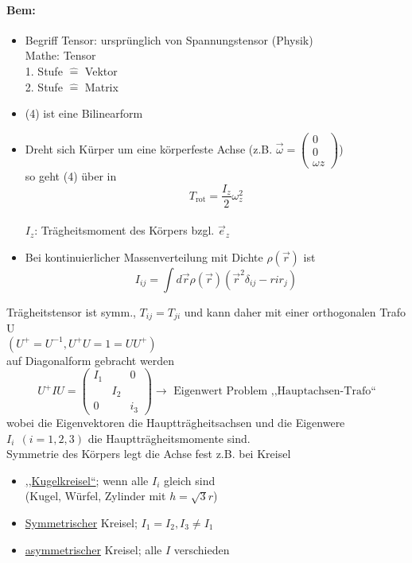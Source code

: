 \documentclass[titlepage,12pt,a4paper,ngerman]{report}
\newcommand{\tx}[1]{\textrm{#1}}
\begin{document}
{\paragraph{Bem:}
\begin{itemize}
	\item Begriff Tensor: ursprünglich von Spannungstensor (Physik) \\
	Mathe: Tensor \\
	1. Stufe $ \widehat{=} $ Vektor\\
	2. Stufe $ \widehat{=} $ Matrix
	\item (4) ist eine Bilinearform
	\item Dreht sich Kürper um eine körperfeste Achse (z.B. $ \vec{\omega} = \begin{pmatrix}
	0\\ 0\\ \omega z
	\end{pmatrix} $) \\
	so geht (4) über in
	$$ T_{\tx{rot}} = \frac{I_z}{2} \omega_z^2$$\\
	$ I_z $: Trägheitsmoment des Körpers bzgl. $ \vec{e}_z $
	\item Bei kontinuierlicher Massenverteilung mit Dichte $ \rho(\vec{r}) $ ist 
	$$I_{ij} = \int d \vec{r} \rho(\vec{r}) (\vec{r}^2 \delta_{ij} - rir_j)$$
\end{itemize}
Trägheitstensor ist symm., $ T_{ij} = T_{ji} $ und kann daher mit einer orthogonalen Trafo U\\
$( U^+ = U^{-1}, U^+ U = 1 = U U ^+) $\\
auf Diagonalform gebracht werden
$$U^+ I U = \begin{pmatrix}
I_1& & 0 \\
& I_2 & \\
0 & & i_3
\end{pmatrix} \rightarrow \tx{ Eigenwert Problem ,,Hauptachsen-Trafo``}$$
wobei die Eigenvektoren die Hauptträgheitsachsen und die Eigenwere $ I_i \ \ (i=1,2,3) $ die Hauptträgheitsmomente sind.\\
Symmetrie des Körpers legt die Achse fest z.B. bei Kreisel
\begin{itemize}
	\item \underline{,,Kugelkreisel``}; wenn alle $ I_i $ gleich sind\\
	(Kugel, Würfel, Zylinder mit $ h=\sqrt{3}r $)
	\item \underline{Symmetrischer} Kreisel; $ I_1 = I_2 ,  I_3 \neq I_1 $
	\item \underline{asymmetrischer} Kreisel; alle $I$ verschieden
\end{itemize}
}
\end{document}
